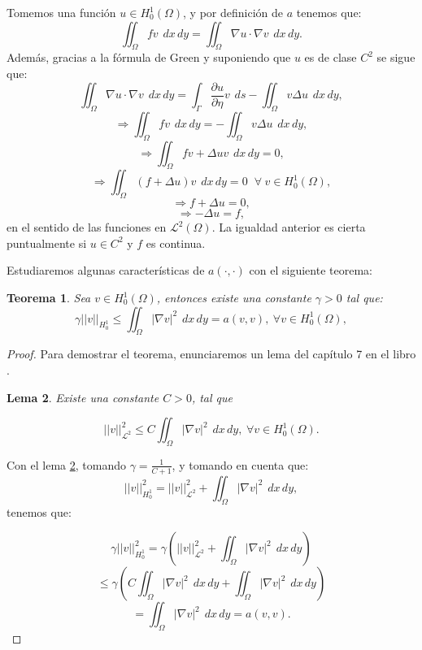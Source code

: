 \documentclass[12pt,spanish,oneside]{book}
\theoremstyle{plain}
\newtheorem{teo}{Teorema}[chapter]
\newtheorem{lema}[teo]{Lema}
\numberwithin{equation}{chapter}
\theoremstyle{definition}
\theoremstyle{remark}
\newcommand{\parc}[2]{\frac{\partial #1}{\partial #2}}
\newcommand{\LD}{\mathcal{L}^2}
\newcommand{\hcu}{H_0^1}
\newcommand{\dxy}{\hspace{5pt} dx\hspace{2pt} dy }
\newcommand{\ds}{\hspace{5pt} ds}
\newcommand{\intomega}[1]{\iint_\Omega #1 \dxy} %
\begin{document}
Tomemos una función $u\in \hcu(\Omega)$, y por definición de $a$ tenemos que:
\[\iint_\Omega f v \dxy =\iint_\Omega \nabla u\cdot \nabla v \dxy. \] 
Además, gracias a la fórmula de Green y suponiendo que $u$ es de clase $ C^2$ se sigue que: 
\[\iint_\Omega \nabla u\cdot \nabla v \dxy=\int_\Gamma \parc{u}{\eta} v \ds -\iint_\Omega v \Delta u \dxy, \]
\[\Rightarrow \iint_\Omega fv \dxy = -\iint_\Omega v \Delta u \dxy,\]
\[\Rightarrow \iint_\Omega fv + \Delta u v\dxy=0,\]
\[\Rightarrow \iint_\Omega \left(f + \Delta u\right)v \dxy=0\phantom{\pi} \forall\hspace{3pt} v\in \hcu(\Omega),\]
\[\Rightarrow f + \Delta u =0,\]
\[\Rightarrow -\Delta u = f, \]
en el sentido de las funciones en $\LD(\Omega)$. La igualdad anterior es cierta puntualmente si $u\in C^2$ y $f$ es continua.

Estudiaremos algunas características de $a(\cdot, \cdot)$ con el siguiente teorema:
\begin{teo} \label{teodesig}
Sea $v\in\hcu(\Omega)$, entonces existe una constante $\gamma>0$ tal que: 
\[\gamma ||v||_{\hcu}\leq\intomega{|\nabla v|^2} = a(v,v),\hspace{3pt} \forall v \in \hcu(\Omega), \]
\end{teo}
\begin{proof}
Para demostrar el teorema, enunciaremos un lema del capítulo 7 en el libro  \cite{Claes}.
\begin{lema}\label{l1}
Existe una constante $C>0$, tal que

\[||v||^2_{\LD}\leq C \intomega{|\nabla v|^2},\hspace{3pt} \forall v \in \hcu(\Omega).\]
\end{lema}
Con el lema \ref{l1}, tomando $\gamma=\frac{1}{C+1}$, y tomando en cuenta que: 
\[||v||^2_{\hcu}=||v||^2_{\LD}+\intomega{|\nabla v|^2},\] 
tenemos que:

\[\gamma ||v||^2_{\hcu}=\gamma\left(||v||^2_{\LD}+\intomega{|\nabla v|^2}\right) \]
\[\leq \gamma\left(C \intomega{|\nabla v|^2}+\intomega{|\nabla v|^2}\right)\]
\[=\intomega{|\nabla v|^2} = a(v,v). \]

\end{proof}
\end{document}
